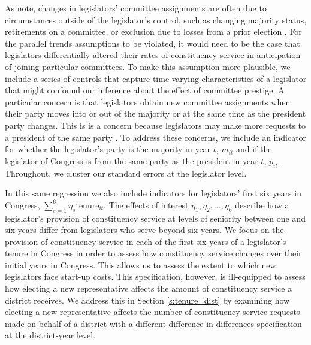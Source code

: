\documentclass[12pt]{article}
\begin{document}
As \cite{BerryFowler2016} note, changes in legislators' committee assignments are often due to circumstances outside of the legislator's control, such as changing majority status, retirements on a committee, or exclusion due to losses from a prior election \citep{GrimmerPowell2013}. For the parallel trends assumptions to be violated, it would need to be the case that legislators differentially altered their rates of constituency service in anticipation of joining particular committees. To make this assumption more plausible, we include a series of controls that capture time-varying characteristics of a legislator that might confound our inference about the effect of committee prestige. A particular concern is that legislators obtain new committee assignments when their party moves into or out of the majority or at the same time as the president party changes. This is is a concern because legislators may make more requests to a president of the same party \citep{BerryBurdenHowell09}. To address these concerns, we include an indicator for whether the legislator's party is the majority in year $t$, $m_{it}$ and if the legislator of Congress is from the same party as the president in year $t$, $p_{it}$. Throughout, we cluster our standard errors at the legislator level.

In this same regression we also include indicators for legislators' first six years in Congress, $ \sum_{s = 1}^{6} \eta_{s} \text{tenure}_{it}$. The effects of interest $\eta_{1}, \eta_{2}, \hdots, \eta_{6}$ describe how a legislator's provision of constituency service at levels of seniority between one and six years differ from legislators who serve beyond six years. We focus on the provision of constituency service in each of the first six years of a legislator's tenure in Congress in order to assess how constituency service changes over their initial years in Congress. This allows us to assess the extent to which new legislators face start-up costs. This specification, however, is ill-equipped to assess how electing a new representative affects the amount of constituency service a district receives. We address this in Section \ref{s:tenure_dist} by examining how electing a new representative affects the number of constituency service requests made on behalf of a district with a different difference-in-differences specification at the district-year level.   
\end{document}
